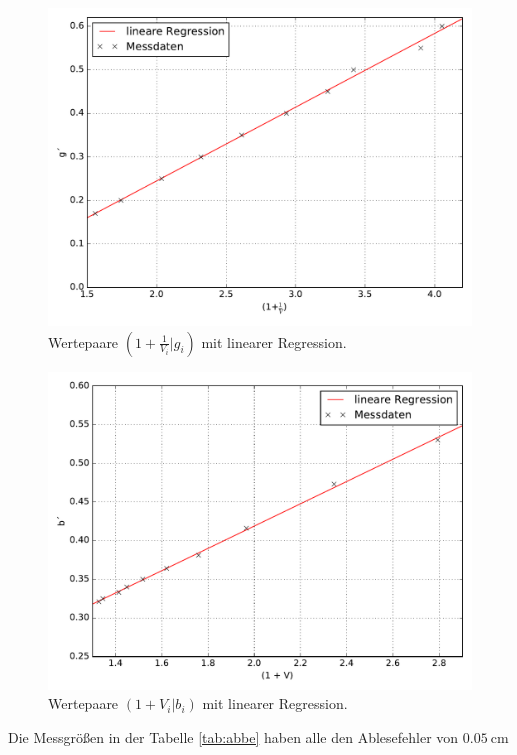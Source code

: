 \begin{figure}
  \centering
  \includegraphics[width=\textwidth]{Pics/Messung_abbe_g.pdf}
  \caption{Wertepaare $(1 + \frac{1}{V_i}|g_i)$ mit linearer Regression.}
  \label{fig:abbe_g}
\end{figure}

\begin{figure}
  \centering
  \includegraphics[width=\textwidth]{Pics/Messung_abbe_b.pdf}
  \caption{Wertepaare $(1 + V_i|b_i)$ mit linearer Regression.}
  \label{fig:abbe_b}
\end{figure}



Die Messgrößen in der Tabelle \ref{tab:abbe} haben alle den Ablesefehler
von $\SI{0,05}{\centi\meter}$

